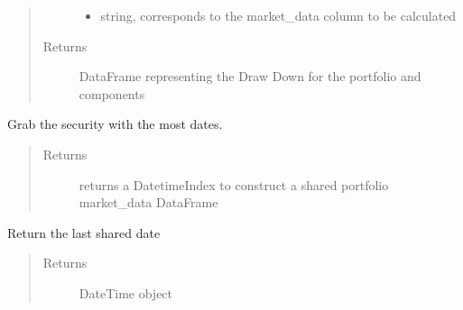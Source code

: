 \documentclass[letterpaper,10pt,english]{sphinxmanual}
\begin{document}
\begin{fulllineitems}
\begin{fulllineitems}
\begin{quote}
\begin{description}
\begin{itemize}
\item {} 
 \textendash{} string, corresponds to the market\_data column to be calculated

\end{itemize}

\item[{Returns}] \leavevmode
DataFrame representing the Draw Down for the portfolio and components

\end{description}\end{quote}

\end{fulllineitems}


\begin{fulllineitems}
\label{\detokenize{securities:risk_dash.securities.Portfolio.get_date}}
Grab the security with the most dates.
\begin{quote}\begin{description}
\item[{Returns}] \leavevmode
returns a DatetimeIndex to construct a shared portfolio market\_data DataFrame

\end{description}\end{quote}

\end{fulllineitems}


\begin{fulllineitems}
\label{\detokenize{securities:risk_dash.securities.Portfolio.get_last_shared_date}}
Return the last shared date
\begin{quote}\begin{description}
\item[{Returns}] \leavevmode
DateTime object

\end{description}\end{quote}

\end{fulllineitems}



\end{fulllineitems}
\end{document}
